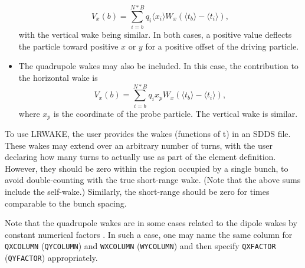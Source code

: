 \begin{itemize}
  \begin{equation}
    V_x(b) = \sum\limits_{i=b}^{N*B} q_i \langle x_i \rangle W_x(\langle t_b \rangle - \langle t_i \rangle),
  \end{equation}
with the vertical wake being similar.
In both cases, a positive value deflects the particle toward positive $x$ or $y$ for a positive offset of the
driving particle.
\item The quadrupole wakes may also be included. In this case, the contribution to the horizontal wake is 
  \begin{equation}
    V_x(b) = \sum\limits_{i=b}^{N*B} q_i x_p W_x(\langle t_b \rangle - \langle t_i \rangle),
  \end{equation}
where $x_p$ is the coordinate of the probe particle. The vertical wake is similar.
\end{itemize}

To use LRWAKE, the user provides the wakes (functions of t) in an SDDS file.
These wakes may extend over an arbitrary number of turns, with the user declaring how many turns
to actually use as part of the element definition.
However, they should be zero within the region occupied by a single bunch, to avoid
double-counting with the true short-range wake.
(Note that the above sums include the self-wake.)
Similarly, the short-range should be zero for times comparable to the bunch spacing.

Note that the quadrupole wakes are in some cases related to the dipole wakes by constant numerical factors \cite{Chao-PRSTAB-111001}. 
In such a case, one may name the same column for \verb|QXCOLUMN| (\verb|QYCOLUMN|) and \verb|WXCOLUMN| (\verb|WYCOLUMN|)
and then specify \verb|QXFACTOR| (\verb|QYFACTOR|) appropriately.

